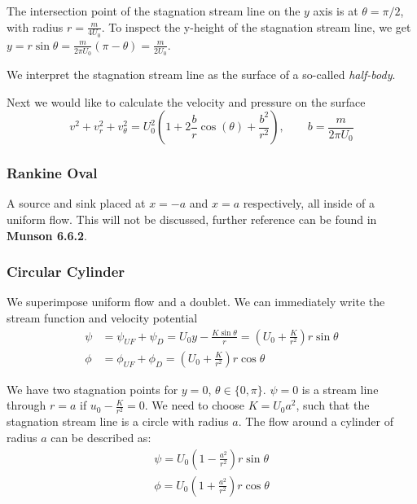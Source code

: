 The intersection point of the stagnation stream line on the $y$ axis is at $\theta=\pi/2$, with radius $r=\frac{m}{4U_0}$.
To inspect the y-height of the stagnation stream line, we get $y=r\sin\theta = \frac{m}{2\pi U_0}(\pi-\theta) = \frac{m}{2 U_0}$.

We interpret the stagnation stream line as the surface of a so-called \textit{half-body}.

Next we would like to calculate the velocity and pressure on the surface
\begin{equation*}
	v^2 + v_r^2 + v_\theta ^2 = U_0^2 \left(1+2\frac{b}{r}\cos(\theta) + \frac{b^2}{r^2}\right), \qquad b = \frac{m}{2\pi U_0}
\end{equation*}

\subsubsection{Rankine Oval}
A source and sink placed at $x=-a$ and $x=a$ respectively, all inside of a uniform flow. This will not be discussed, further reference can be found in \textbf{Munson 6.6.2}.

\subsubsection{Circular Cylinder}
We superimpose uniform flow and a doublet. We can immediately write the stream function and velocity potential
\begin{equation*}
	\begin{split}
		\psi &= \psi_{UF} + \psi_{D} = U_0y - \frac{K\sin\theta}{r} = \left(U_0+\frac{K}{r^2}\right)r\sin\theta\\
		\phi &= \phi_{UF} + \phi_D = \left(U_0+\frac K{r^2}\right)r\cos\theta
	\end{split}
\end{equation*}

We have two stagnation points for $y=0$, $\theta\in\{0,\pi\}$. $\psi=0$ is a stream line through $r=a$ if $u_0-\frac K{r^2}=0$. We need to choose $K=U_0a^2$, such that the stagnation stream line is a circle with radius $a$. The flow around a cylinder of radius $a$ can be described as:
\begin{equation*}
	\begin{split}
		\psi = U_0 \left(1-\frac{a^2}{r^2}\right) r \sin\theta\\
		\phi = U_0 \left(1+\frac{a^2}{r^2}\right)r \cos\theta
	\end{split}
\end{equation*}

